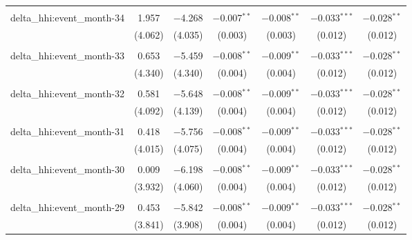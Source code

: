 \begin{table}[H]
{\begin{tabular}{@{\extracolsep{5pt}}lcccccc}
   & & & & & & \\  

  delta\_hhi:event\_month-34 & 1.957 & $-$4.268 & $-$0.007$^{**}$ & $-$0.008$^{**}$ & $-$0.033$^{***}$ & $-$0.028$^{**}$ \\  

   & (4.062) & (4.035) & (0.003) & (0.003) & (0.012) & (0.012) \\  

   & & & & & & \\  

  delta\_hhi:event\_month-33 & 0.653 & $-$5.459 & $-$0.008$^{**}$ & $-$0.009$^{**}$ & $-$0.033$^{***}$ & $-$0.028$^{**}$ \\  

   & (4.340) & (4.340) & (0.004) & (0.004) & (0.012) & (0.012) \\  

   & & & & & & \\  

  delta\_hhi:event\_month-32 & 0.581 & $-$5.648 & $-$0.008$^{**}$ & $-$0.009$^{**}$ & $-$0.033$^{***}$ & $-$0.028$^{**}$ \\  

   & (4.092) & (4.139) & (0.004) & (0.004) & (0.012) & (0.012) \\  

   & & & & & & \\  

  delta\_hhi:event\_month-31 & 0.418 & $-$5.756 & $-$0.008$^{**}$ & $-$0.009$^{**}$ & $-$0.033$^{***}$ & $-$0.028$^{**}$ \\  

   & (4.015) & (4.075) & (0.004) & (0.004) & (0.012) & (0.012) \\  

   & & & & & & \\  

  delta\_hhi:event\_month-30 & 0.009 & $-$6.198 & $-$0.008$^{**}$ & $-$0.009$^{**}$ & $-$0.033$^{***}$ & $-$0.028$^{**}$ \\  

   & (3.932) & (4.060) & (0.004) & (0.004) & (0.012) & (0.012) \\  

   & & & & & & \\  

  delta\_hhi:event\_month-29 & 0.453 & $-$5.842 & $-$0.008$^{**}$ & $-$0.009$^{**}$ & $-$0.033$^{***}$ & $-$0.028$^{**}$ \\  

   & (3.841) & (3.908) & (0.004) & (0.004) & (0.012) & (0.012) \\  


\end{tabular}}
\end{table}
